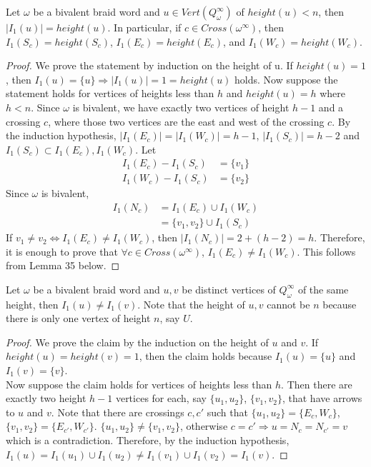 \begin{lemma}
Let $\omega$ be a bivalent braid word and $u\in Vert(Q_\omega^\infty)$ of $height(u)<n$, then $|I_1(u)|=height(u)$. In particular, if $c\in Cross(\omega^\infty)$, then $I_1(S_c)=height(S_c)$, $I_1(E_c)=height(E_c)$, and $I_1(W_c)=height(W_c)$.
\end{lemma}
\begin{proof}
We prove the statement by induction on the height of u. If $height(u) = 1$, then $I_1(u) = \{u \} \Rightarrow |I_1(u)| = 1 = height(u)$ holds. Now suppose the statement holds for vertices of heights less than $h$ and $height(u) =h$ where $h<n$. Since $\omega$ is bivalent, we have exactly two vertices of height $h-1$ and a crossing $c$, where those two vertices are the east and west of the crossing $c$. By the induction hypothesis, $|I_1(E_c)| = |I_1(W_c)| = h-1$, $|I_1(S_c)| = h-2$ and $I_1(S_c)\subset I_1(E_c),I_1(W_c)$. Let
\begin{align*}
	I_1(E_c) - I_1(S_c) &= \{v_1\} \\
	I_1(W_c) - I_1(S_c) &= \{v_2\}
\end{align*}
Since $\omega$ is bivalent, 
\begin{align*}
	I_1(N_c) &= I_1(E_c) \cup I_1(W_c) \\
			 &= \{v_1, v_2\} \cup I_1(S_c)
\end{align*}
If $v_1 \neq v_2\Leftrightarrow I_1(E_c) \neq I_1(W_c)$, then $|I_1(N_c)| = 2 + (h-2) = h$. Therefore, it is enough to prove that $\forall c\in Cross(\omega^\infty)$, $I_1(E_c) \neq I_1(W_c)$. This follows from Lemma 35 below.
\end{proof}

\begin{lemma}
Let $\omega$ be a bivalent braid word and $u,v$ be distinct vertices of $Q_\omega^\infty$ of the same height, then $I_1(u) \neq I_1(v)$. Note that the height of $u,v$ cannot be $n$ because there is only one vertex of height $n$, say $U$.
\end{lemma}
\begin{proof}
We prove the claim by the induction on the height of $u$ and $v$. If $height(u) = height(v) = 1$, then the claim holds because $I_1(u) = \{u\}$ and $I_1(v) = \{v\}$. \\
Now suppose the claim holds for vertices of heights less than $h$. Then there are exactly two height $h-1$ vertices for each, say $\{u_1,u_2\}$, $\{v_1,v_2\}$, that have arrows to $u$ and $v$. Note that there are crossings $c,c'$ such that $\{u_1,u_2\}=\{E_c,W_c\}$, $\{v_1,v_2\}=\{E_{c'},W_{c'}\}$. $\{u_1,u_2\}\neq\{v_1,v_2\}$, otherwise $c=c'\Rightarrow u=N_c=N_{c'}=v$ which is a contradiction. Therefore, by the induction hypothesis, $I_1(u) = I_1(u_1)\cup I_1(u_2)\neq I_1(v_1)\cup I_1(v_2) = I_1(v)$.
\end{proof}

